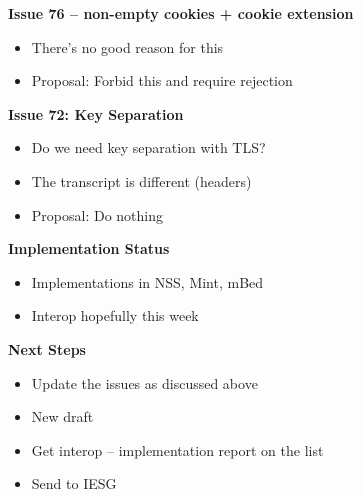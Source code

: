 \documentclass[helvetica]{seminar}
\newcommand{\heading}[1]{%
  \begin{center} 
    \large\bf 
    #1 
  \end{center} 
  \vspace{.4 in}}
\begin{document}
\begin{slide}
  \heading{Issue 76 -- non-empty cookies + cookie extension}

  \begin{itemize}
  \item There's no good reason for this
  \item Proposal: Forbid this and require rejection
  \end{itemize}
\end{slide}


\begin{slide}
  \heading{Issue 72: Key Separation}

  \begin{itemize}
  \item Do we need key separation with TLS?
  \item The transcript is different (headers)
  \item Proposal: Do nothing
  \end{itemize}
\end{slide}

\begin{slide}
  \heading{Implementation Status}

  \begin{itemize}
  \item Implementations in NSS, Mint, mBed
  \item Interop hopefully this week
  \end{itemize}
\end{slide}

\begin{slide}
\heading{Next Steps}

\begin{itemize}
\item Update the issues as discussed above
\item New draft
\item Get interop -- implementation report on the list
\item Send to IESG
\end{itemize}
\end{slide}
\end{document}
